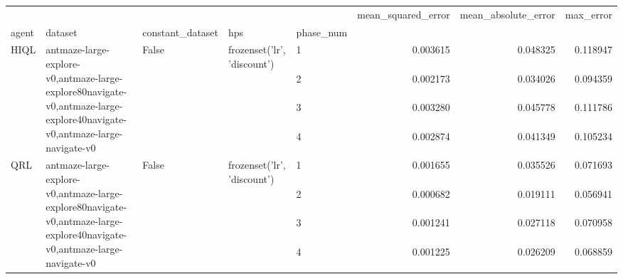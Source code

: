 \begin{tabular}{lllllrrr}
\toprule
 &  &  &  &  & mean_squared_error & mean_absolute_error & max_error \\
agent & dataset & constant_dataset & hps & phase_num &  &  &  \\
\midrule
\multirow[t]{4}{*}{HIQL} & \multirow[t]{4}{*}{antmaze-large-explore-v0,antmaze-large-explore80navigate-v0,antmaze-large-explore40navigate-v0,antmaze-large-navigate-v0} & \multirow[t]{4}{*}{False} & \multirow[t]{4}{*}{frozenset({'lr', 'discount'})} & 1 & 0.003615 & 0.048325 & 0.118947 \\
 &  &  &  & 2 & 0.002173 & 0.034026 & 0.094359 \\
 &  &  &  & 3 & 0.003280 & 0.045778 & 0.111786 \\
 &  &  &  & 4 & 0.002874 & 0.041349 & 0.105234 \\
\cline{1-8} \cline{2-8} \cline{3-8} \cline{4-8}
\multirow[t]{4}{*}{QRL} & \multirow[t]{4}{*}{antmaze-large-explore-v0,antmaze-large-explore80navigate-v0,antmaze-large-explore40navigate-v0,antmaze-large-navigate-v0} & \multirow[t]{4}{*}{False} & \multirow[t]{4}{*}{frozenset({'lr', 'discount'})} & 1 & 0.001655 & 0.035526 & 0.071693 \\
 &  &  &  & 2 & 0.000682 & 0.019111 & 0.056941 \\
 &  &  &  & 3 & 0.001241 & 0.027118 & 0.070958 \\
 &  &  &  & 4 & 0.001225 & 0.026209 & 0.068859 \\
\cline{1-8} \cline{2-8} \cline{3-8} \cline{4-8}
\bottomrule
\end{tabular}
